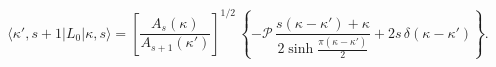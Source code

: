 \begin{equation}
\langle\kappa',s+1|L_0|\kappa,s\rangle=
\left[\frac{A_s(\kappa)}{A_{s+1}(\kappa')}\right]^{1/2}\,
\left\{
-\mathscr{P}\,\frac{s(\kappa-\kappa')+\kappa}{2\sinh\frac{\pi(\kappa-\kappa')}{2}}
+2s\,\delta(\kappa-\kappa')\right\}.
\end{equation}

